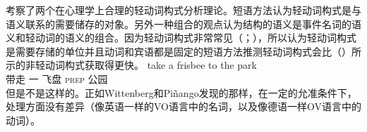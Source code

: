 \begin{exe}
\begin{xlist}[iv.]
\begin{exe}
\begin{xlist}[iv.]
 \citet{WP2011a}考察了两个在心理学上合理的轻动词构式分析理论。短语方法认为轻动词构式是与语义联系的需要储存的对象\citep{Goldberg2003a}。另外一种组合的观点认为结构的语义是事件名词的语义和轻动词的语义的组合\citep{Grimshaw97a-u,Butt2003a-u,Jackendoff2002a-u,CJ2005a,MuellerPersian,BPW2008a-u}。因为轻动词构式非常常见（\citealp*{Pinango:2006qy}；\citealp[]{WP2011a}），所以认为轻动词构式是需要存储的单位并且动词和宾语都是固定的短语方法推测轻动词构式会比（）所示的非轻动词构式获取得更快\citep[]{WP2011a}。
\ea
\gll take a frisbee to the park\\
     带走 一 飞盘 \textsc{prep}  公园\\
\z
但是不是这样的。正如Wittenberg和Piñango发现的那样，在一定的允准条件下，处理方面没有差异（像英语一样的VO语言中的名词，以及像德语一样OV语言中的动词）。


\end{xlist}
\end{exe}
\end{xlist}
\end{exe}
